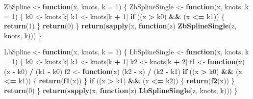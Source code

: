\documentclass[
  12pt,
]{article}
\newenvironment{Shaded}{\begin{snugshade}}{\end{snugshade}}
\newcommand{\ControlFlowTok}[1]{\textcolor[rgb]{0.13,0.29,0.53}{\textbf{#1}}}
\newcommand{\DataTypeTok}[1]{\textcolor[rgb]{0.13,0.29,0.53}{#1}}
\newcommand{\DecValTok}[1]{\textcolor[rgb]{0.00,0.00,0.81}{#1}}
\newcommand{\KeywordTok}[1]{\textcolor[rgb]{0.13,0.29,0.53}{\textbf{#1}}}
\newcommand{\NormalTok}[1]{#1}
\newcommand{\OperatorTok}[1]{\textcolor[rgb]{0.81,0.36,0.00}{\textbf{#1}}}
\newcommand{\StringTok}[1]{\textcolor[rgb]{0.31,0.60,0.02}{#1}}
\begin{document}
\begin{Shaded}
\begin{Highlighting}[]
\NormalTok{ZbSpline \textless{}{-}}\StringTok{ }\ControlFlowTok{function}\NormalTok{(x, knots, }\DataTypeTok{k =} \DecValTok{1}\NormalTok{) \{}
\NormalTok{  ZbSplineSingle \textless{}{-}}\StringTok{ }\ControlFlowTok{function}\NormalTok{(x, knots, }\DataTypeTok{k =} \DecValTok{1}\NormalTok{) \{}
\NormalTok{    k0 \textless{}{-}}\StringTok{ }\NormalTok{knots[k]}
\NormalTok{    k1 \textless{}{-}}\StringTok{ }\NormalTok{knots[k }\OperatorTok{+}\StringTok{ }\DecValTok{1}\NormalTok{]}
    \ControlFlowTok{if}\NormalTok{ ((x }\OperatorTok{\textgreater{}}\StringTok{ }\NormalTok{k0) }\OperatorTok{\&\&}\StringTok{ }\NormalTok{(x }\OperatorTok{\textless{}=}\StringTok{ }\NormalTok{k1)) \{}
      \KeywordTok{return}\NormalTok{(}\DecValTok{1}\NormalTok{)}
\NormalTok{    \}}
    \KeywordTok{return}\NormalTok{(}\DecValTok{0}\NormalTok{)}
\NormalTok{  \}}
  \KeywordTok{return}\NormalTok{(}\KeywordTok{sapply}\NormalTok{(x, }\ControlFlowTok{function}\NormalTok{(z)}
    \KeywordTok{ZbSplineSingle}\NormalTok{(z, knots, k)))}
\NormalTok{\}}

\NormalTok{LbSpline \textless{}{-}}\StringTok{ }\ControlFlowTok{function}\NormalTok{(x, knots, }\DataTypeTok{k =} \DecValTok{1}\NormalTok{) \{}
\NormalTok{  LbSplineSingle \textless{}{-}}\StringTok{ }\ControlFlowTok{function}\NormalTok{(x, knots, }\DataTypeTok{k =} \DecValTok{1}\NormalTok{) \{}
\NormalTok{    k0 \textless{}{-}}\StringTok{ }\NormalTok{knots[k]}
\NormalTok{    k1 \textless{}{-}}\StringTok{ }\NormalTok{knots[k }\OperatorTok{+}\StringTok{ }\DecValTok{1}\NormalTok{]}
\NormalTok{    k2 \textless{}{-}}\StringTok{ }\NormalTok{knots[k }\OperatorTok{+}\StringTok{ }\DecValTok{2}\NormalTok{]}
\NormalTok{    f1 \textless{}{-}}\StringTok{ }\ControlFlowTok{function}\NormalTok{(x)}
\NormalTok{      (x }\OperatorTok{{-}}\StringTok{ }\NormalTok{k0) }\OperatorTok{/}\StringTok{ }\NormalTok{(k1 }\OperatorTok{{-}}\StringTok{ }\NormalTok{k0)}
\NormalTok{    f2 \textless{}{-}}\StringTok{ }\ControlFlowTok{function}\NormalTok{(x)}
\NormalTok{      (k2 }\OperatorTok{{-}}\StringTok{ }\NormalTok{x) }\OperatorTok{/}\StringTok{ }\NormalTok{(k2 }\OperatorTok{{-}}\StringTok{ }\NormalTok{k1)}
    \ControlFlowTok{if}\NormalTok{ ((x }\OperatorTok{\textgreater{}}\StringTok{ }\NormalTok{k0) }\OperatorTok{\&\&}\StringTok{ }\NormalTok{(x }\OperatorTok{\textless{}=}\StringTok{ }\NormalTok{k1)) \{}
      \KeywordTok{return}\NormalTok{(}\KeywordTok{f1}\NormalTok{(x))}
\NormalTok{    \}}
    \ControlFlowTok{if}\NormalTok{ ((x }\OperatorTok{\textgreater{}}\StringTok{ }\NormalTok{k1) }\OperatorTok{\&\&}\StringTok{ }\NormalTok{(x }\OperatorTok{\textless{}=}\StringTok{ }\NormalTok{k2)) \{}
      \KeywordTok{return}\NormalTok{(}\KeywordTok{f2}\NormalTok{(x))}
\NormalTok{    \}}
    \KeywordTok{return}\NormalTok{(}\DecValTok{0}\NormalTok{)}
\NormalTok{  \}}
  \KeywordTok{return}\NormalTok{(}\KeywordTok{sapply}\NormalTok{(x, }\ControlFlowTok{function}\NormalTok{(z)}
    \KeywordTok{LbSplineSingle}\NormalTok{(z, knots, k)))}
\NormalTok{\}}


\end{Highlighting}
\end{Shaded}
\end{document}
